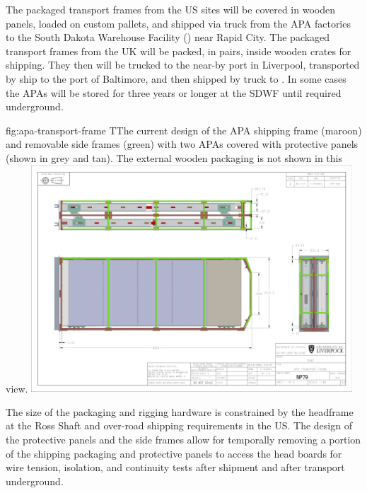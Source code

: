 The packaged transport frames from the US sites will be covered in wooden panels, loaded on custom pallets, and shipped via truck from the APA factories to the South Dakota Warehouse Facility () near Rapid City. The packaged transport frames from the UK will be packed, in pairs, inside wooden crates for shipping. They then will be trucked to the near-by port in Liverpool, transported by ship to the port of Baltimore, and then shipped by truck to . In some cases the APAs will be stored for three years or longer at the SDWF until required underground. 

\begin{dunefigure}{fig:apa-transport-frame}
{TThe current design of the APA shipping frame (maroon) and removable side frames (green) with two APAs covered with protective panels (shown in grey and tan). The external wooden packaging is not shown in this view.}  
\includegraphics[width=0.9\textwidth]{graphics/sp-apa-transport-box-drawing.png} 
\end{dunefigure}

The size of the packaging and rigging hardware is constrained by the headframe at the Ross Shaft and over-road shipping requirements in the US. The design of the protective panels and the side frames allow for temporally removing a portion of the shipping packaging and protective panels to access the  head boards for wire tension, isolation, and continuity tests after shipment and after transport underground. 

